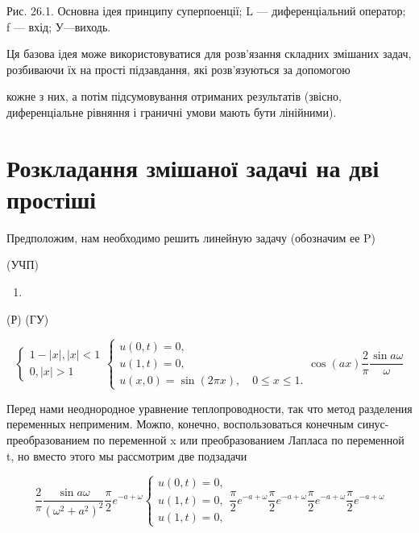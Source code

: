 \documentclass[
  ukrainian,
]{article}
\providecommand{\tightlist}{%
  \setlength{\itemsep}{0pt}\setlength{\parskip}{0pt}}
\begin{document}
Рис. 26.1. Основна ідея принципу суперпоенції; L --- диференціальний
оператор; f --- вхід; У---виходь.

Ця базова ідея може використовуватися для розв'язання складних змішаних
задач, розбиваючи їх на прості підзавдання, які розв'язуються за
допомогою

кожне з них, а потім підсумовування отриманих результатів (звісно,
диференціальне рівняння і граничні умови мають бути лінійними).

\section{Розкладання змішаної задачі на дві
простіші}\label{ux440ux43eux437ux43aux43bux430ux434ux430ux43dux43dux44f-ux437ux43cux456ux448ux430ux43dux43eux457-ux437ux430ux434ux430ux447ux456-ux43dux430-ux434ux432ux456-ux43fux440ux43eux441ux442ux456ux448ux456}

Предположим, нам необходимо решить линейную задачу (обозначим ее P)

(УЧП)

\begin{enumerate}
\def\labelenumi{\arabic{enumi}.}
\setcounter{enumi}{17}
\tightlist
\item
\end{enumerate}

(Р) (ГУ)

\[
\begin{cases} 1-|x|, |x| < 1 \\ 0, |x| > 1 \end{cases}
\begin{cases} u(0, t) = 0, \\ u(1, t) = 0, \\ u(x, 0) = \sin(2\pi x), \quad 0 \le x \le 1. \end{cases}
\cos(ax)
\frac{2}{\pi} \frac{\sin a\omega}{\omega}
\]

Перед нами неоднородное уравнение теплопроводности, так что метод
разделения переменных неприменим. Можпо, конечно, воспользоваться
конечным синус-преобразованием по переменной x или преобразованием
Лапласа по переменной t, но вместо этого мы рассмотрим две подзадачи

\[
\frac{2}{\pi} \frac{\sin a\omega}{(\omega^2+a^2)^2}
\frac{\pi}{2} e^{-a+\omega}
\begin{cases} u(0, t) = 0, \\ u(1, t) = 0, \\ u(1, t) = 0, \end{cases}
\frac{\pi}{2} e^{-a+\omega}
\frac{\pi}{2} e^{-a+\omega}
\frac{\pi}{2} e^{-a+\omega}
\frac{\pi}{2} e^{-a+\omega}
\]
\end{document}
